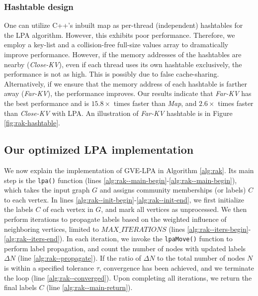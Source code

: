\subsubsection{Hashtable design}

One can utilize C++'s inbuilt map as per-thread (independent) hashtables for the LPA algorithm. However, this exhibits poor performance. Therefore, we employ a key-list and a collision-free full-size values array to dramatically improve performance. However, if the memory addresses of the hashtables are nearby (\textit{Close-KV}), even if each thread uses its own hashtable exclusively, the performance is not as high. This is possibly due to false cache-sharing. Alternatively, if we ensure that the memory address of each hashtable is farther away (\textit{Far-KV}), the performance improves. Our results indicate that \textit{Far-KV} has the best performance and is $15.8\times$ times faster than \textit{Map}, and $2.6\times$ times faster than \textit{Close-KV} with LPA. An illustration of \textit{Far-KV} hashtable is in Figure \ref{fig:rak-hashtable}.







\subsection{Our optimized LPA implementation}

We now explain the implementation of GVE-LPA in Algorithm \ref{alg:rak}. Its main step is the \texttt{lpa()} function (lines \ref{alg:rak--main-begin}-\ref{alg:rak--main-begin}), which takes the input graph $G$ and assigns community memberships (or labels) $C$ to each vertex. In lines \ref{alg:rak--init-begin}-\ref{alg:rak--init-end}, we first initialize the labels $C$ of each vertex in $G$, and mark all vertices as unprocessed. We then perform iterations to propagate labels based on the weighted influence of neighboring vertices, limited to $MAX\_ITERATIONS$ (lines \ref{alg:rak--iters-begin}-\ref{alg:rak--iters-end}). In each iteration, we invoke the \texttt{lpaMove()} function to perform label propagation, and count the number of nodes with updated labels $\Delta N$ (line \ref{alg:rak--propagate}). If the ratio of $\Delta N$ to the total number of nodes $N$ is within a specified tolerance $\tau$, convergence has been achieved, and we terminate the loop (line \ref{alg:rak--converged}). Upon completing all iterations, we return the final labels $C$ (line \ref{alg:rak--main-return}).

